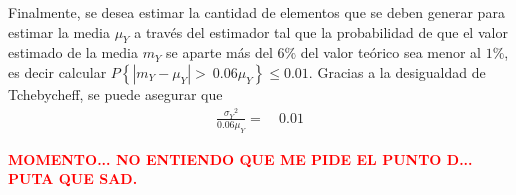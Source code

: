 Finalmente, se desea estimar la cantidad de elementos que se deben generar para estimar la media $\mu_Y$ a través del estimador tal que la probabilidad de que el valor estimado de la media $m_Y$ se aparte más del $6\%$ del valor teórico sea menor al $1\%$, es decir calcular $P\left\lbrace | m_Y - \mu_Y | > \ 0.06 \mu_Y \right\rbrace \leq 0.01$. Gracias a la desigualdad de Tchebycheff, se puede asegurar que
\begin{equation}
	\begin{aligned}
	\frac{{\sigma_Y}^2}{0.06 \mu_Y} = & \ 0.01
	\end{aligned}
\end{equation}

\textcolor{red}{\textbf{MOMENTO... NO ENTIENDO QUE ME PIDE EL PUNTO D... PUTA QUE SAD.}}

